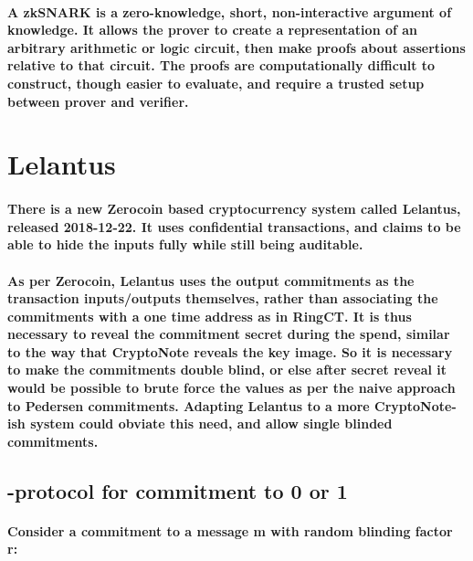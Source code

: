 \documentclass{article}
\begin{document}
\paragraph{A zkSNARK is a zero-knowledge, short, non-interactive argument of knowledge.  It allows the prover to create a representation of an arbitrary arithmetic or logic circuit, then make proofs about assertions relative to that circuit.  The proofs are computationally difficult to construct, though easier to evaluate, and require a trusted setup between prover and verifier.}



\section{Lelantus}

\paragraph{There is a new Zerocoin based cryptocurrency system called Lelantus, released 2018-12-22.  It uses confidential transactions, and claims to be able to hide the inputs fully while still being auditable.  }

\paragraph{As per Zerocoin, Lelantus uses the output commitments as the transaction inputs/outputs themselves, rather than associating the commitments with a one time address as in RingCT.  It is thus necessary to reveal the commitment secret during the spend, similar to the way that CryptoNote reveals the key image.  So it is necessary to make the commitments double blind, or else after secret reveal it would be possible to brute force the values as per the naive approach to Pedersen commitments.  Adapting Lelantus to a more CryptoNote-ish system could obviate this need, and allow single blinded commitments.}


\subsection{-protocol for commitment to 0 or 1}

\paragraph{Consider a commitment to a message m with random blinding factor r:}
\end{document}
